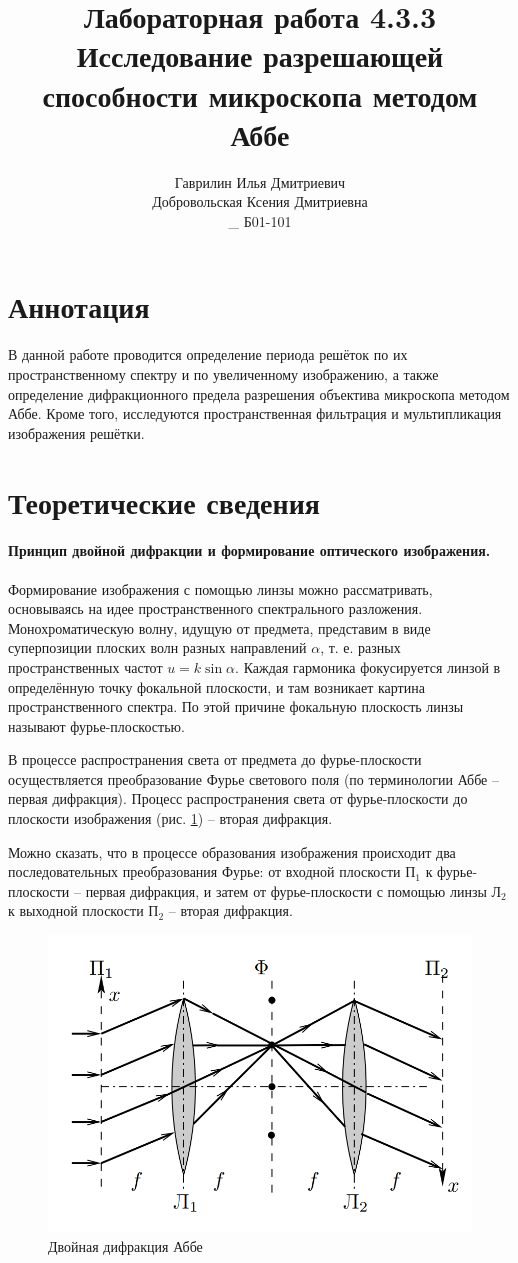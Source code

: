 \documentclass[a4paper, 12pt]{article}%
\author{Гаврилин Илья Дмитриевич \\
		Добровольская  Ксения Дмитриевна\\_{}
	Б01-101}
\title{\textbf{Лабораторная работа 4.3.3\\ 
		Исследование разрешающей способности микроскопа методом Аббе}}
\begin{document}
	\maketitle
	\section{Аннотация}
	
	В данной работе проводится определение периода решёток по их пространственному спектру и по увеличенному изображению, а также определение дифракционного предела разрешения объектива микроскопа методом Аббе. Кроме того, исследуются пространственная фильтрация и мультипликация изображения решётки.
	
	\section{Теоретические сведения}
	
	\paragraph{Принцип двойной дифракции и формирование оптического	изображения.}
	
	Формирование изображения с помощью линзы можно рассматривать, основываясь на идее пространственного спектрального разложения. Монохроматическую волну, идущую от предмета, представим в виде суперпозиции плоских волн разных направлений $ \alpha $, т. е. разных пространственных частот $ u = k \sin \alpha $. Каждая гармоника фокусируется линзой в определённую точку фокальной плоскости, и там возникает картина пространственного спектра. По этой причине фокальную плоскость линзы называют фурье-плоскостью.
	
	В процессе распространения света от предмета до фурье-плоскости осуществляется преобразование Фурье светового поля (по терминологии Аббе -- первая дифракция). Процесс распространения света от фурье-плоскости до плоскости изображения (рис. \ref{fig:screenshot1}) -- вторая дифракция.
	
	Можно сказать, что в процессе образования изображения происходит два последовательных преобразования Фурье: от входной плоскости $ П_1 $ к фурье-плоскости -- первая дифракция, и затем от фурье-плоскости с помощью линзы $ Л_2 $ к выходной плоскости $ П_2 $ -- вторая дифракция.
	
	\begin{figure}[H]
		\centering
		\includegraphics[width=0.7\linewidth]{Screenshot_1}
		\caption{Двойная дифракция Аббе}
		\label{fig:screenshot1}
	\end{figure}
	
\end{document}
